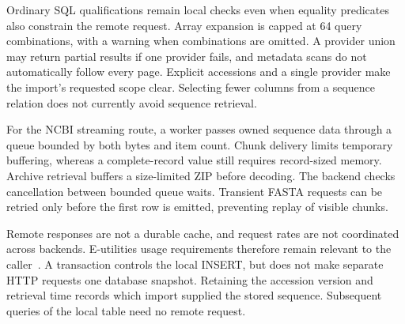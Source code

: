 Ordinary SQL qualifications remain local checks even when equality predicates
also constrain the remote request. Array expansion is capped at 64 query
combinations, with a warning when combinations are omitted. A provider union
may return partial results if one provider fails, and metadata scans do not
automatically follow every page. Explicit accessions and a single provider
make the import's requested scope clear. Selecting fewer columns from a
sequence relation does not currently avoid sequence retrieval.

For the NCBI streaming route, a worker passes owned sequence data through a queue
bounded by both bytes and item count. Chunk delivery limits temporary
buffering, whereas a complete-record value still requires record-sized memory.
Archive retrieval buffers a size-limited ZIP before decoding. The backend checks
cancellation between bounded queue waits. Transient FASTA requests can be
retried only before the first row is emitted, preventing replay of visible
chunks.

Remote responses are not a durable cache, and request rates are not coordinated
across backends. E-utilities usage requirements therefore remain relevant to
the caller~\autocite{ncbiEutilitiesUsage}. A transaction controls the local INSERT,
but does not make separate HTTP requests one database snapshot. Retaining the
accession version and retrieval time records which import supplied the stored
sequence. Subsequent queries of the local table need no remote request.

